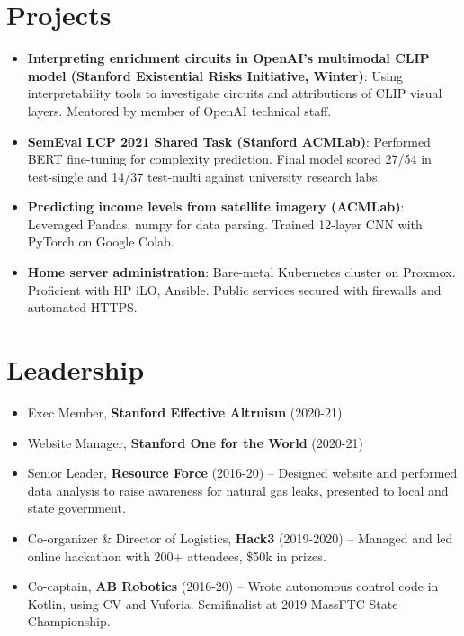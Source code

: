 \documentclass[letterpaper,11pt]{article}
\begin{document}
\section{Projects}

\begin{itemize}[label=--]
     \item \textbf{Interpreting enrichment circuits in OpenAI's multimodal CLIP model (Stanford Existential Risks Initiative, Winter)}: Using interpretability tools to investigate circuits and attributions of CLIP visual layers. Mentored by member of OpenAI technical staff.
     \item \textbf{SemEval LCP 2021 Shared Task (Stanford ACMLab)}: Performed BERT fine-tuning for complexity prediction. Final model scored 27/54 in test-single and 14/37 test-multi against university research labs.
     \item \textbf{Predicting income levels from satellite imagery (ACMLab)}:
           Leveraged Pandas, numpy for data parsing. Trained 12-layer CNN with PyTorch on
           Google Colab.

     \item \textbf{Home server administration}: Bare-metal Kubernetes cluster on Proxmox.
           Proficient with HP iLO, Ansible. Public services secured with firewalls and
           automated HTTPS.
\end{itemize}

\section{Leadership}

\begin{itemize}[label=--]
     \item Exec Member, \textbf{Stanford Effective Altruism} (2020-21)
     \item Website Manager, \textbf{Stanford One for the World} (2020-21)
     \item Senior Leader, \textbf{Resource Force} (2016-20) --
           \href{https://gasleaks.info}{Designed website} and performed data analysis to raise awareness for natural gas leaks, presented to local and state
           government.
     \item Co-organizer \& Director of Logistics, \textbf{Hack3} (2019-2020) -- Managed and led online hackathon
           with 200+ attendees, \$50k in prizes.
     \item Co-captain, \textbf{AB Robotics} (2016-20) -- Wrote autonomous control code in
           Kotlin, using CV and Vuforia. Semifinalist at 2019 MassFTC State Championship.
\end{itemize}
\end{document}
